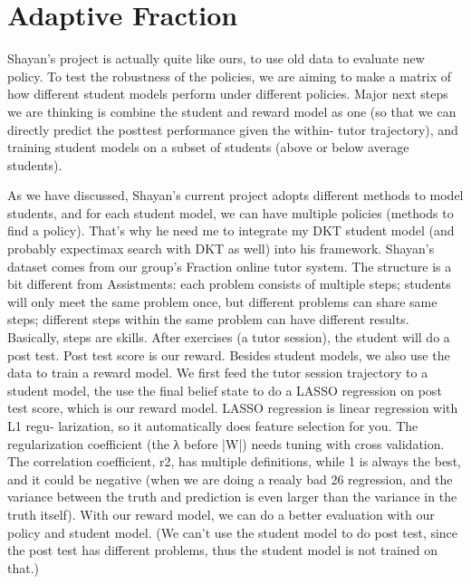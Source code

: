 \section{Adaptive Fraction}
\label{sec:fraction}

Shayan’s project is actually quite like ours, to use old data to evaluate new policy. To test the robustness of the policies, we are aiming to make a matrix of how different student models perform under different policies. Major next steps we are thinking is combine the student and reward model as one (so that we can directly predict the posttest performance given the within- tutor trajectory), and training student models on a subset of students (above or below average students).


As we have discussed, Shayan’s current project adopts different methods to model students, and for each student model, we can have multiple policies (methods to find a policy). That’s why he need me to integrate my DKT student model (and probably expectimax search with DKT as well) into his framework.
Shayan’s dataset comes from our group’s Fraction online tutor system. The structure is a bit different from Assistments: each problem consists of multiple steps; students will only meet the same problem once, but different problems can share same steps; different steps within the same problem can have different results. Basically, steps are skills. After exercises (a tutor session), the student will do a post test. Post test score is our reward.
Besides student models, we also use the data to train a reward model. We first feed the tutor session trajectory to a student model, the use the final belief state to do a LASSO regression on post test score, which is our reward model. LASSO regression is linear regression with L1 regu- larization, so it automatically does feature selection for you. The regularization coefficient (the λ before |W|) needs tuning with cross validation. The correlation coefficient, r2, has multiple definitions, while 1 is always the best, and it could be negative (when we are doing a reaaly bad
26
regression, and the variance between the truth and prediction is even larger than the variance in the truth itself).
With our reward model, we can do a better evaluation with our policy and student model. (We can’t use the student model to do post test, since the post test has different problems, thus the student model is not trained on that.)


